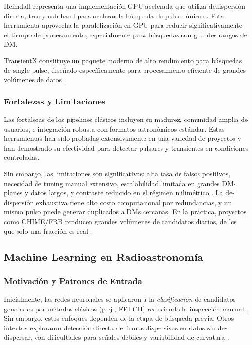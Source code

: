 Heimdall representa una implementación GPU-acelerada que utiliza dedispersión directa, tree y sub-band para acelerar la búsqueda de pulsos únicos \citep{Barsdell_2012}. Esta herramienta aprovecha la paralelización en GPU para reducir significativamente el tiempo de procesamiento, especialmente para búsquedas con grandes rangos de DM.

TransientX constituye un paquete moderno de alto rendimiento para búsquedas de single-pulse, diseñado específicamente para procesamiento eficiente de grandes volúmenes de datos \citep{2024A&A...683A.183M}.

\subsubsection{Fortalezas y Limitaciones}

Las fortalezas de los pipelines clásicos incluyen su madurez, comunidad amplia de usuarios, e integración robusta con formatos astronómicos estándar. Estas herramientas han sido probadas extensivamente en una variedad de proyectos y han demostrado su efectividad para detectar pulsares y transientes en condiciones controladas.

Sin embargo, las limitaciones son significativas: alta tasa de falsos positivos, necesidad de tuning manual extensivo, escalabilidad limitada en grandes DM-planes y datos largos, y contraste reducido en el régimen milimétrico \citep{Barsdell_2012}. La de-dispersión exhaustiva tiene alto costo computacional por redundancias, y un mismo pulso puede generar duplicados a DMs cercanas. En la práctica, proyectos como CHIME/FRB producen grandes volúmenes de candidatos diarios, de los que solo una fracción es real \citep{CHIME2021}.


\subsection{Machine Learning en Radioastronomía}

\subsubsection{Motivación y Patrones de Entrada}

Inicialmente, las redes neuronales se aplicaron a la \textit{clasificación} de candidatos generados por métodos clásicos (p.ej., FETCH) reduciendo la inspección manual \citep{Agarwal_2020,Petroff_2022}. Sin embargo, estos enfoques dependen de la etapa de búsqueda previa. Otros intentos exploraron detección directa de firmas dispersivas en datos sin de-dispersar, con dificultades para señales débiles y variabilidad de curvatura \citep{Zhang_2020}.

